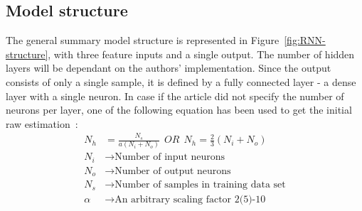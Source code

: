 \subsection{Model structure} \label{subsec:structure}
The general summary model structure is represented in Figure~\ref{fig:RNN-structure}, with three feature inputs and a single output.
The number of hidden layers will be dependant on the authors' implementation.
Since the output consists of only a single sample, it is defined by a fully connected layer - a dense layer with a single neuron.
In case if the article did not specify the number of neurons per layer, one of the following equation has been used to get the initial raw estimation~\cite{eckhardt_choosing_2018}:
\begin{equation}
    \begin{split}
        N_h &= \frac{N_s}{ a \left(N_i+N_o \right)} \ \ OR \ \ N_h = \frac{2}{3}\left(N_i+N_o \right) \\
        N_i &\rightarrow \text{Number of input neurons} \\
        N_o &\rightarrow \text{Number of output neurons} \\
        N_s &\rightarrow \text{Number of samples in training data set} \\
        \alpha &\rightarrow \text{An arbitrary scaling factor 2(5)-10}
    \end{split}
\end{equation}


